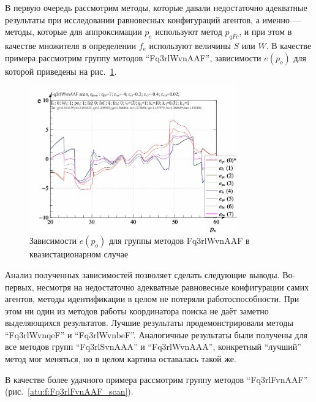 В первую очередь рассмотрим методы, которые давали
недостаточно адекватные результаты при
исследовании равновесных конфигураций агентов, а именно ---
методы, которые для аппроксимации $p_e$
используют метод $p_{qFc}$, и при этом в качестве
множителя в определении $f_e$ используют величины $S$ или $W$.
В качестве примера рассмотрим группу методов ``Fq3rlWvnAAF'',
зависимости $e(p_o)$ для которой приведены на рис.~\ref{atu:f:Fq3rlWvnAAF_scan}.

\begin{figure}[htb!]
  \centerline{
    \includegraphics[width=0.8\textwidth]{p/scan/qls-p_p_e_Fq3rlWvnAAF_scan.png}
  }
  \caption{Зависимости $e(p_o)$ для группы методов Fq3rlWvnAAF в квазистационарном случае}
  \label{atu:f:Fq3rlWvnAAF_scan}
\end{figure}

Анализ полученных зависимостей позволяет сделать следующие выводы.
Во-первых, несмотря на недостаточно адекватные равновесные конфигурации
самих агентов, методы идентификации в целом не потеряли работоспособности.
При этом ни один из методов работы координатора поиска
не даёт заметно выделяющихся результатов.
Лучшие результаты продемонстрировали методы
``Fq3rlWvnqeF'' и ``Fq3rlWvnbeF''.
Аналогичные результаты были получены для все методов групп
``Fq3rlSvnAAA'' и ``Fq3rlWvnAAA'', конкретный ``лучший'' метод
мог меняться, но в целом картина оставалась такой же.

В качестве более удачного примера рассмотрим
группу методов ``Fq3rlFvnAAF'' (рис.~\ref{atu:f:Fq3rlFvnAAF_scan}).

